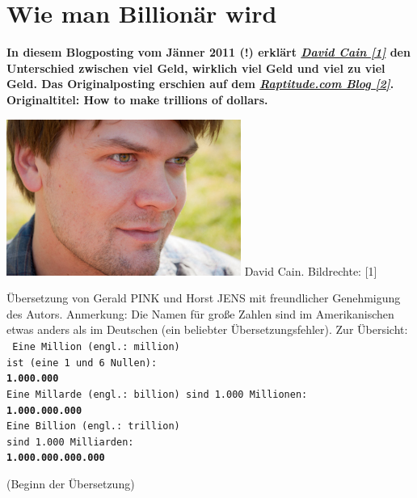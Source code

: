 \section*{Wie man Billion\"ar wird}
\label{trillions}

\textbf{In diesem Blogposting vom Jänner 2011 (!) erklärt \href{http://www.raptitude.com/contact/}{\textit{David Cain [1]}} den Unterschied zwischen viel Geld, wirklich viel Geld und viel zu viel Geld. Das Originalposting erschien auf dem \href{http://www.raptitude.com/2011/01/how-to-make-trillions-of-dollars}{\textit{Raptitude.com Blog [2]}}. Originaltitel: How to make trillions of dollars.}

\begin{center}
\includegraphics[width=0.9\linewidth]{trillions/trillions-davidcain.jpg} 
\footnotesize{David Cain. Bildrechte: [1]}
\end{center}

Übersetzung von Gerald PINK und Horst JENS mit freundlicher Genehmigung des Autors. Anmerkung: Die Namen für große Zahlen sind im Amerikanischen etwas anders als im Deutschen (ein beliebter Übersetzungsfehler). Zur Übersicht: \\
\texttt{
Eine Million  (engl.: million)\\
ist (eine 1 und 6 Nullen):\\
\textbf{1.000.000}\\
Eine Millarde (engl.: billion)
sind 1.000 Millionen:\\
\textbf{1.000.000.000}\\
Eine Billion  (engl.: trillion) \\
sind 1.000 Milliarden: \\
\textbf{1.000.000.000.000}
}

(Beginn der Übersetzung) \\


